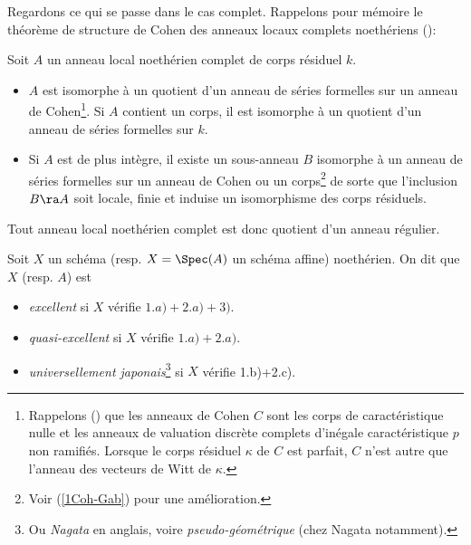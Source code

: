 \documentclass[10pt]{../fichiers-configuration-latex/smfart}
\begin{document}
Regardons ce qui se passe dans le cas complet. Rappelons pour mémoire le théorème de structure de
Cohen des anneaux locaux complets noethériens ():

\begin{theoreme}[Cohen]\label{1Co} Soit $A$ un anneau local noethérien complet de corps résiduel
$k$.\begin{itemize} \item [(i)] $A$ est isomorphe à un quotient d'un anneau de séries formelles sur
un anneau de Cohen\footnote{Rappelons () que les anneaux de Cohen $C$ sont les
corps de caractéristique nulle et les anneaux de valuation discrète complets d'inégale
caractéristique $p$ non ramifiés.  Lorsque le corps résiduel $\kappa$ de $C$ est parfait, $C$ n'est
autre que l'anneau des vecteurs de Witt de $\kappa$.}. Si $A$ contient  un corps, il est isomorphe à
un quotient d'un anneau de séries formelles sur $k$.  \item [(ii)] Si $A$ est de plus intègre, il
existe un sous-anneau $B$ isomorphe à un anneau de séries formelles sur un anneau de Cohen ou un
corps\footnote{Voir (\ref{1Coh-Gab}) pour une amélioration.} de sorte que l'inclusion $B\ra A$ soit
locale,  finie et  induise un isomorphisme  des corps résiduels.  \end{itemize} \end{theoreme}

Tout anneau local noethérien complet est donc quotient d'un anneau régulier.

\begin{definition}\label{1def-excellent} Soit $X$ un schéma (resp. $X=\Spec(A)$ un schéma affine)
noethérien. On dit que $X$ (resp. $A$) est \begin{itemize} \item \emph{excellent} si $X$ vérifie
$1.a)+2.a)+3)$.  \item \emph{quasi-excellent} si $X$ vérifie $1.a)+2.a)$.  \item
\emph{universellement japonais}\footnote{Ou \emph{Nagata} en anglais, voire
\emph{pseudo-géométrique} (chez Nagata notamment).} si $X$ vérifie 1.b)+2.c).  \end{itemize}
\end{definition}
\end{document}
